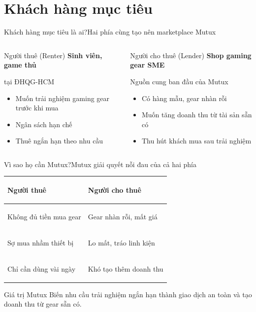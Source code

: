 \section{Khách hàng mục tiêu}

\begin{frame}{Khách hàng mục tiêu là ai?}{Hai phía cùng tạo nên marketplace Mutux}
  \begin{columns}[T,onlytextwidth]
      \begin{block}{Người thuê (Renter)}
        \centering\large\textbf{Sinh viên, game thủ}\par
        \centering\scriptsize tại ĐHQG-HCM
        \vspace{.4em}
        \begin{itemize}\small
          \item Muốn trải nghiệm gaming gear trước khi mua
          \item Ngân sách hạn chế
          \item Thuê ngắn hạn theo nhu cầu
        \end{itemize}
      \end{block}
      \begin{exampleblock}{Người cho thuê (Lender)}
        \centering\large\textbf{Shop gaming gear SME}\par
        \centering\scriptsize Nguồn cung ban đầu của Mutux
        \vspace{.4em}
        \begin{itemize}\small
          \item Có hàng mẫu, gear nhàn rỗi
          \item Muốn tăng doanh thu từ tài sản sẵn có
          \item Thu hút khách mua sau trải nghiệm
        \end{itemize}
      \end{exampleblock}
  \end{columns}
  \vfill
  \centering{} \hspace{.25em} \hspace{.25em}
\end{frame}

\begin{frame}{Vì sao họ cần Mutux?}{Mutux giải quyết nỗi đau của cả hai phía}
  \centering\small
  \begin{tabularx}{.9\textwidth}{@{}>{\bfseries\raggedright\arraybackslash}X>{\raggedright\arraybackslash}X@{}}
    \toprule
    Người thuê & Người cho thuê \\
    \midrule
    Không đủ tiền mua gear & Gear nhàn rỗi, mất giá \\
    Sợ mua nhầm thiết bị & Lo mất, tráo linh kiện \\
    Chỉ cần dùng vài ngày & Khó tạo thêm doanh thu \\
    \bottomrule
  \end{tabularx}
  \vfill
  \begin{block}{Giá trị Mutux}
    Biến nhu cầu trải nghiệm ngắn hạn thành giao dịch an toàn và tạo doanh thu từ gear sẵn có.
  \end{block}
\end{frame}
